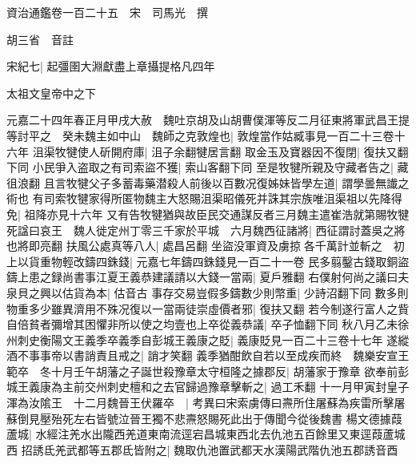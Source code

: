 資治通鑑卷一百二十五　宋　司馬光　撰

胡三省　音註

宋紀七|{
	起彊圉大淵獻盡上章攝提格凡四年}


太祖文皇帝中之下

元嘉二十四年春正月甲戌大赦　魏吐京胡及山胡曹僕渾等反二月征東將軍武昌王提等討平之　癸未魏主如中山　魏師之克敦煌也|{
	敦煌當作姑臧事見一百二十三卷十六年}
沮渠牧犍使人斫開府庫|{
	沮子余翻犍居言翻}
取金玉及寶器因不復閉|{
	復扶又翻下同}
小民爭入盗取之有司索盜不獲|{
	索山客翻下同}
至是牧犍所親及守藏者告之|{
	藏徂浪翻}
且言牧犍父子多蓄毒藥潜殺人前後以百數况復姊妹皆學左道|{
	謂學曇無䜟之術也}
有司索牧犍家得所匿物魏主大怒賜沮渠昭儀死并誅其宗族唯沮渠祖以先降得免|{
	祖降亦見十六年}
又有告牧犍猶與故臣民交通謀反者三月魏主遣崔浩就第賜牧犍死諡曰哀王　魏人徙定州丁零三千家於平城　六月魏西征諸將|{
	西征謂討蓋吳之將也將即亮翻}
扶風公處真等八人|{
	處昌呂翻}
坐盜没軍資及虜掠各千萬計並斬之　初上以貨重物輕改鑄四銖錢|{
	元嘉七年鑄四銖錢見一百二十一卷}
民多翦鑿古錢取銅盜鑄上患之録尚書事江夏王義恭建議請以大錢一當兩|{
	夏戶雅翻}
右僕射何尚之議曰夫泉貝之興以估貨為本|{
	估音古}
事存交易豈假多鑄數少則幣重|{
	少詩沼翻下同}
數多則物重多少雖異濟用不殊况復以一當兩徒崇虛價者邪|{
	復扶又翻}
若今制遂行富人之貲自倍貧者彌增其困懼非所以使之均壹也上卒從義恭議|{
	卒子恤翻下同}
秋八月乙未徐州刺史衡陽文王義季卒義季自彭城王義康之貶|{
	義康貶見一百二十三卷十七年}
遂縱酒不事事帝以書誚責且戒之|{
	誚才笑翻}
義季猶酣飲自若以至成疾而終　魏樂安宣王範卒　冬十月壬午胡藩之子誕世殺豫章太守桓隆之據郡反|{
	胡藩家于豫章}
欲奉前彭城王義康為主前交州刺史檀和之去官歸過豫章擊斬之|{
	過工禾翻}
十一月甲寅封皇子渾為汝隂王　十二月魏晉王伏羅卒　|{
	考異曰宋索虜傳曰燾所住屠蘇為疾雷所擊屠蘇倒見壓殆死左右皆號泣晉王獨不悲燾怒賜死此出于傳聞今從後魏書}
楊文德據葭蘆城|{
	水經注羌水出隴西羌道東南流逕宕昌城東西北去仇池五百餘里又東逕葭蘆城西}
招誘氐羌武都等五郡氐皆附之|{
	魏取仇池置武都天水漢陽武階仇池五郡誘音酉}


